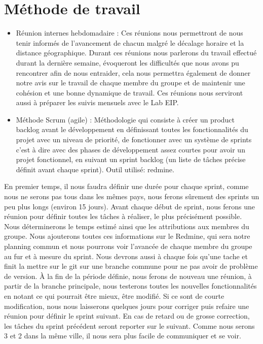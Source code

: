 \section{Méthode de travail}
\begin{itemize}
\item Réunion internes hebdomadaire : Ces réunions nous permettront de nous tenir informés de l’avancement de chacun malgré le décalage horaire et la distance géographique. Durant ces réunions nous parlerons du travail effectué durant la dernière semaine, évoqueront les difficultés que nous avons pu rencontrer afin de nous entraider, cela nous permettra également de donner notre avis sur le travail de chaque membre du groupe et de maintenir une cohésion et une bonne dynamique de travail. Ces réunions nous serviront aussi à préparer les suivis mensuels avec le Lab EIP.\\
\item Méthode Scrum (agile) : Méthodologie qui consiste à créer un product backlog avant le développement en définissant toutes les fonctionnalités du projet avec un niveau de priorité, de fonctionner avec un système de sprints c’est à dire avec des phases de développement assez courtes pour avoir un projet fonctionnel, en suivant un sprint backlog (un liste de tâches précise définit avant chaque sprint). Outil utilisé: redmine.\\
\end{itemize}
En premier temps, il nous faudra définir une durée pour chaque sprint, comme nous ne serons pas tous dans les mêmes pays, nous ferons sûrement des sprints un peu plus longs (environ 15 jours). Avant chaque début de sprint, nous ferons une réunion pour définir toutes les tâches à réaliser, le plus précisément possible. Nous déterminerons le temps estimé ainsi que les attributions aux membres du groupe. Nous ajouterons toutes ces informations sur le Redmine, qui sera notre planning commun et nous pourrons voir l’avancée de chaque membre du groupe au fur et à mesure du sprint. Nous devrons aussi à chaque fois qu’une tache et finit la mettre sur le git sur une branche commune pour ne pas avoir de problème de version. À la fin de la période définie, nous ferons de nouveau une réunion, à partir de la branche principale, nous testerons toutes les nouvelles fonctionnalités en notant ce qui pourrait être mieux, être modifié. Si ce sont de courte modification, nous nous laisserons quelques jours pour corriger puis refaire une réunion pour définir le sprint suivant. En cas de retard ou de grosse correction, les tâches du sprint précédent seront reporter sur le suivant. Comme nous serons 3 et 2 dans la même ville, il nous sera plus facile de communiquer et se voir.\\
